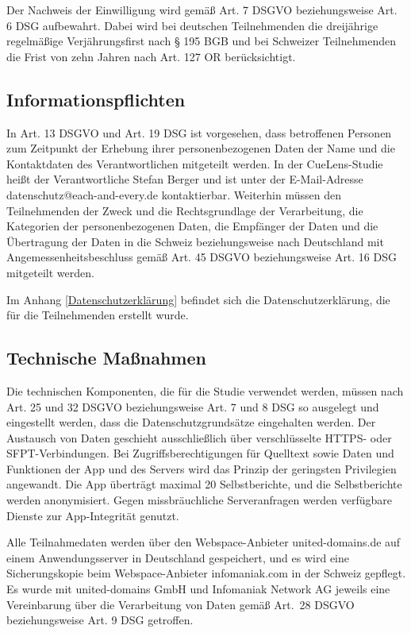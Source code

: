 Der Nachweis der Einwilligung wird gemäß Art. 7 DSGVO beziehungsweise Art. 6 DSG aufbewahrt. Dabei wird bei deutschen Teilnehmenden die dreijährige regelmäßige Verjährungsfirst nach § 195 BGB und bei Schweizer Teilnehmenden die Frist von zehn Jahren nach Art. 127 OR berücksichtigt.

\subsection{Informationspflichten}
In Art. 13 DSGVO und Art. 19 DSG ist vorgesehen, dass betroffenen Personen zum Zeitpunkt der Erhebung ihrer personenbezogenen Daten der Name und die Kontaktdaten des Verantwortlichen mitgeteilt werden. In der CueLens-Studie heißt der Verantwortliche Stefan Berger und ist unter der E-Mail-Adresse datenschutz@each-and-every.de kontaktierbar. Weiterhin müssen den Teilnehmenden der Zweck und die Rechtsgrundlage der Verarbeitung, die Kategorien der personenbezogenen Daten, die Empfänger der Daten und die Übertragung der Daten in die Schweiz beziehungsweise nach Deutschland mit Angemessenheitsbeschluss gemäß Art. 45 DSGVO beziehungsweise Art. 16 DSG mitgeteilt werden. 

Im Anhang \ref{Datenschutzerklärung} befindet sich die Datenschutzerklärung, die für die Teilnehmenden erstellt wurde.

\subsection{Technische Maßnahmen}
Die technischen Komponenten, die für die Studie verwendet werden, müssen nach Art. 25 und 32 DSGVO beziehungsweise Art. 7 und 8 DSG so ausgelegt und eingestellt werden, dass die Datenschutzgrundsätze eingehalten werden. Der Austausch von Daten geschieht ausschließlich über verschlüsselte HTTPS- oder SFPT-Verbindungen. Bei Zugriffsberechtigungen für Quelltext sowie Daten und Funktionen der App und des Servers wird das Prinzip der geringsten Privilegien angewandt. Die App überträgt maximal 20 Selbstberichte, und die Selbstberichte werden anonymisiert. Gegen missbräuchliche Serveranfragen werden verfügbare Dienste zur App-Integrität genutzt.

Alle Teilnahmedaten werden über den Webspace-Anbieter united-domains.de auf einem Anwendungsserver in Deutschland gespeichert, und es wird eine Sicherungskopie beim Webspace-Anbieter infomaniak.com in der Schweiz gepflegt. Es wurde mit united-domains GmbH und Infomania\-k Network AG jeweils eine Vereinbarung über die Verarbeitung von Daten gemäß Art.~28 DSGVO beziehungsweise Art. 9 DSG getroffen. 

